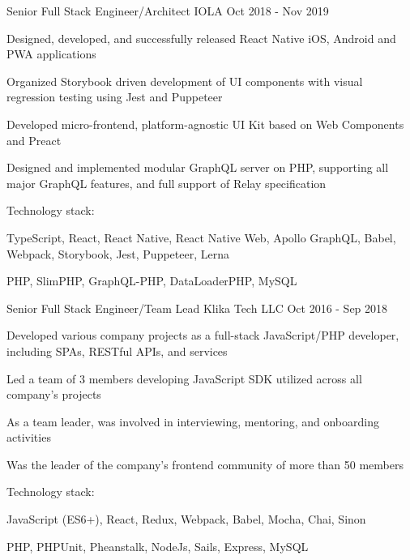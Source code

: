 \begin{cventries}
  \cventry
    {Senior Full Stack Engineer/Architect} %
    {IOLA} %
    {} %
    {Oct 2018 - Nov 2019} %
    {
      \begin{cvitems}
        \item Designed, developed, and successfully released React Native iOS, Android and PWA applications
        \item Organized Storybook driven development of UI components with visual regression testing using Jest and Puppeteer
        \item Developed micro-frontend, platform-agnostic UI Kit based on Web Components and Preact
        \item Designed and implemented modular GraphQL server on PHP, supporting all major GraphQL features, and full support of Relay specification
      \end{cvitems}
      \vspace{5mm}
      Technology stack:
      \begin{cvstackitems}
        \item TypeScript, React, React Native, React Native Web, Apollo GraphQL, Babel, Webpack, Storybook, Jest, Puppeteer, Lerna
        \item PHP, SlimPHP, GraphQL-PHP, DataLoaderPHP, MySQL
      \end{cvstackitems}
      \vspace{-2.0mm}
    }

  \cventry
    {Senior Full Stack Engineer/Team Lead} %
    {Klika Tech LLC} %
    {} %
    {Oct 2016 - Sep 2018} %
    {
      \begin{cvitems}
        \item Developed various company projects as a full-stack JavaScript/PHP developer, including SPAs, RESTful APIs, and services
        \item Led a team of 3 members developing JavaScript SDK utilized across all company's projects
        \item As a team leader, was involved in interviewing, mentoring, and onboarding activities
        \item Was the leader of the company's frontend community of more than 50 members
      \end{cvitems}
      \vspace{5mm}
      Technology stack:
      \begin{cvstackitems}
        \item JavaScript (ES6+), React, Redux, Webpack, Babel, Mocha, Chai, Sinon
        \item PHP, PHPUnit, Pheanstalk, NodeJs, Sails, Express, MySQL
      \end{cvstackitems}
      \vspace{-2.0mm}
    }


\end{cventries}
